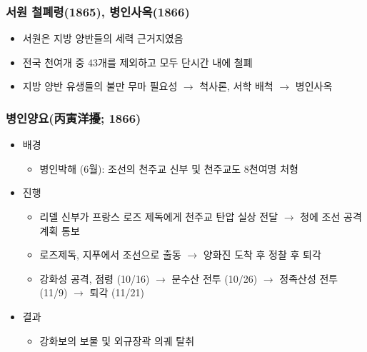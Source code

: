 \subsubsection*{서원 철폐령(1865), 병인사옥(1866)}

\begin{itemize}
    \item 서원은 지방 양반들의 세력 근거지였음
    \item 전국 천여개 중 43개를 제외하고 모두 단시간 내에 철폐
    \item 지방 양반 유생들의 불만 무마 필요성 $\rightarrow$ 척사론, 서학 배척 $\rightarrow$ 병인사옥
\end{itemize}
\pagebreak

\subsubsection*{병인양요(丙寅洋擾; 1866)}

\begin{itemize}
    \item 배경
    \begin{itemize}
        \item 병인박해 (6월): 조선의 천주교 신부 및 천주교도 8천여명 처형
    \end{itemize}
    \item 진행
    \begin{itemize}
        \item 리델 신부가 프랑스 로즈 제독에게 천주교 탄압 실상 전달 $\rightarrow$ 청에 조선 공격 계획 통보
        \item 로즈제독, 지푸에서 조선으로 출동 $\rightarrow$ 양화진 도착 후 정찰 후 퇴각
        \item 강화성 공격, 점령 (10/16) $\rightarrow$ 문수산 전투 (10/26) $\rightarrow$ 정족산성 전투 (11/9) $\rightarrow$ 퇴각 (11/21)
    \end{itemize}
    \item 결과
    \begin{itemize}
        \item 강화보의 보물 및 외규장곽 의궤 탈취
    \end{itemize}
\end{itemize}

